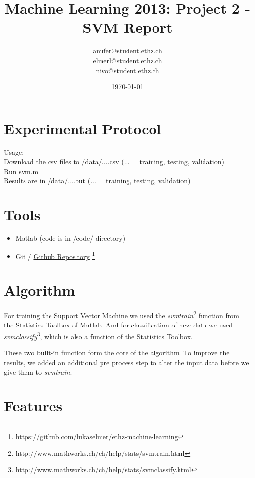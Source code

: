 \documentclass[a4paper, 11pt]{article}
\title{Machine Learning 2013: Project 2 - SVM Report}
\author{anufer@student.ethz.ch\\ elmerl@student.ethz.ch\\ nivo@student.ethz.ch\\}
\date{\today}
\begin{document}
\maketitle

\section*{Experimental Protocol}
Usage:\\
Download the csv files to /data/....csv (... = training, testing, validation)\\
Run svm.m \\
Results are in /data/....out (... = training, testing, validation)

\section{Tools}

\begin{itemize}
\item Matlab (code is in /code/ directory)
\item Git / \href{https://github.com/lukaselmer/ethz-machine-learning}{Github Repository} \footnote{https://github.com/lukaselmer/ethz-machine-learning}
\end{itemize}

\section{Algorithm}
\label{sec:Algorithm}
For training the Support Vector Machine we used the \textit{svmtrain}\footnote{http://www.mathworks.ch/ch/help/stats/svmtrain.html} function from the Statistics Toolbox of Matlab. And for classification of new data we used \textit{svmclassify}\footnote{http://www.mathworks.ch/ch/help/stats/svmclassify.html}, which is also a function of the Statistics Toolbox.

These two built-in function form the core of the algorithm. To improve the results, we added an additional pre process step to alter the input data before we give them to \textit{svmtrain}.
\section{Features}
\label{sec:Features}
\end{document}

